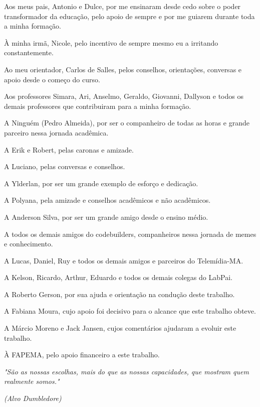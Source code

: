 \documentclass[
	12pt,				%
	openright,			%
	oneside,			%
	a4paper,			%
	ho do papel. 
	english,			%
	french,				%
	spanish,			%
	brazil,				%
	]{abntex2}
\begin{document}

\begin{agradecimentos}

Aos meus pais, Antonio e Dulce, por me ensinaram desde cedo sobre o poder transformador da educação, pelo apoio de sempre e por me guiarem durante toda a minha formação.

À minha irmã, Nicole, pelo incentivo de sempre mesmo eu a irritando constantemente.

Ao meu orientador, Carlos de Salles, pelos conselhos, orientações, conversas e apoio desde o começo do curso.

Aos professores Simara, Ari, Anselmo, Geraldo, Giovanni, Dallyson e todos os demais professores que contribuiram para a minha formação.

A Ninguém (Pedro Almeida), por ser o companheiro de todas as horas e grande parceiro nessa jornada acadêmica.

A Erik e Robert, pelas caronas e amizade.

A Luciano, pelas conversas e conselhos.

A Ylderlan, por ser um grande exemplo de esforço e dedicação.

A Polyana, pela amizade e conselhos acadêmicos e não acadêmicos.

A Anderson Silva, por ser um grande amigo desde o ensino médio.

A todos os demais amigos do codebuilders, companheiros nessa jornada de memes e conhecimento.

A Lucas, Daniel, Ruy e todos os demais amigos e parceiros do Telemídia-MA.

A Kelson, Ricardo, Arthur, Eduardo e todos os demais colegas do LabPai.

A Roberto Gerson, por sua ajuda e orientação na condução deste trabalho.

A Fabiana Moura, cujo apoio foi decisivo para o alcance que este trabalho obteve.

A Márcio Moreno e Jack Jansen, cujos comentários ajudaram a evoluir este trabalho.

À FAPEMA, pelo apoio financeiro a este trabalho.



\end{agradecimentos}

\begin{epigrafe} 
\vspace*{\fill} 
\begin{flushright} 
\textit{"São as nossas escolhas, mais do que as nossas capacidades, que mostram quem realmente somos."} 

\textit{(Alvo Dumbledore)}
\end{flushright} 


\end{epigrafe} 
\end{document}
